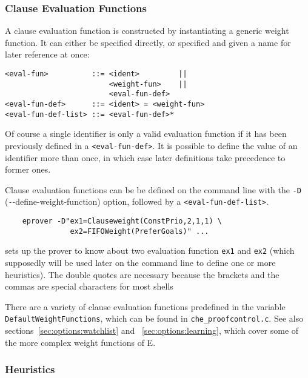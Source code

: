 \documentclass{article}
\begin{document}
\subsubsection{Clause Evaluation Functions}

A clause evaluation function is constructed by instantiating a generic
weight function. It can either be specified directly, or specified and
given a name for later reference at once:

 \begin{verbatim}
<eval-fun>          ::= <ident>         ||
                        <weight-fun>    ||
                        <eval-fun-def>  
<eval-fun-def>      ::= <ident> = <weight-fun>
<eval-fun-def-list> ::= <eval-fun-def>*
\end{verbatim}

Of course a single identifier is only a valid evaluation function if
it has been previously defined in a \texttt{<eval-fun-def>}. It is
possible to define the value of an identifier more than once, in which
case later definitions take precedence to former ones.

Clause evaluation functions can be be defined on the command line with
the \texttt{-D} (\texttt--{define-weight-function}) option, followed
by a \texttt{<eval-fun-def-list>}.

\begin{example}
\begin{verbatim}
    eprover -D"ex1=Clauseweight(ConstPrio,2,1,1) \
               ex2=FIFOWeight(PreferGoals)" ...
\end{verbatim}
  sets up the prover to know about two evaluation function
  \texttt{ex1} and \texttt{ex2} (which supposedly will be used later on
  the command line to define one or more heuristics). The double
  quotes are necessary because the brackets and the commas are
  special characters for most shells
\end{example}

There are a variety of clause evaluation functions predefined in
the variable \texttt{DefaultWeightFunctions}, which can be found in
\texttt{che\_proofcontrol.c}. See also
sections~\ref{sec:options:watchlist} and ~\ref{sec:options:learning},
which cover some of the more complex weight functions of E.


\subsubsection{Heuristics}
\end{document}
